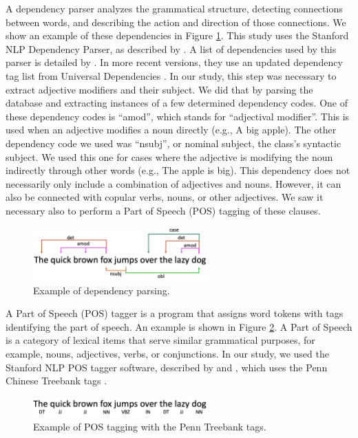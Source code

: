 \documentclass[smallextended,natbib]{svjour3}       %
\begin{document}
    A dependency parser analyzes the grammatical structure, detecting connections between words, and describing the action and direction of those connections. We show an example of these dependencies in Figure \ref{fig:depparse}. This study uses the Stanford NLP Dependency Parser, as described by \cite{chen-EMNLP:2014}. A list of dependencies used by this parser is detailed by \cite{marneffe_manning_2016_depparse_manual}. In more recent versions, they use an updated dependency tag list from Universal Dependencies \cite[][]{zeman2018conll}. In our study, this step was necessary to extract adjective modifiers and their subject. We did that by parsing the database and extracting instances of a few determined dependency codes. One of these dependency codes is ``amod'', which stands for ``adjectival modifier''. This is used when an adjective modifies a noun directly (e.g., A big apple). The other dependency code we used was ``nsubj'', or nominal subject, the class's syntactic subject. We used this one for cases where the adjective is modifying the noun indirectly through other words (e.g., The apple is big). This dependency does not necessarily only include a combination of adjectives and nouns. However, it can also be connected with copular verbs, nouns, or other adjectives. We saw it necessary also to perform a Part of Speech (POS) tagging of these clauses.

    \begin{figure}[ht]
    \centering
    \includegraphics[width=0.6\textwidth]{depparse.png}
    \caption{Example of dependency parsing.}
    \label{fig:depparse}
    \end{figure}

    A Part of Speech (POS) tagger is a program that assigns word tokens with tags identifying the part of speech. An example is shown in Figure \ref{fig:postag}. A Part of Speech is a category of lexical items that serve similar grammatical purposes, for example, nouns, adjectives, verbs, or conjunctions. In our study, we used the Stanford NLP POS tagger software, described by \cite{toutanova2000enriching} and \cite{toutanova2003feature}, which uses the Penn Chinese Treebank tags \cite[][]{xia_penntreebank}.

    \begin{figure}[ht]
    \centering
    \includegraphics[width=0.6\textwidth]{postag.png}
    \caption{Example of POS tagging with the Penn Treebank tags.}
    \label{fig:postag}
    \end{figure}
\end{document}
